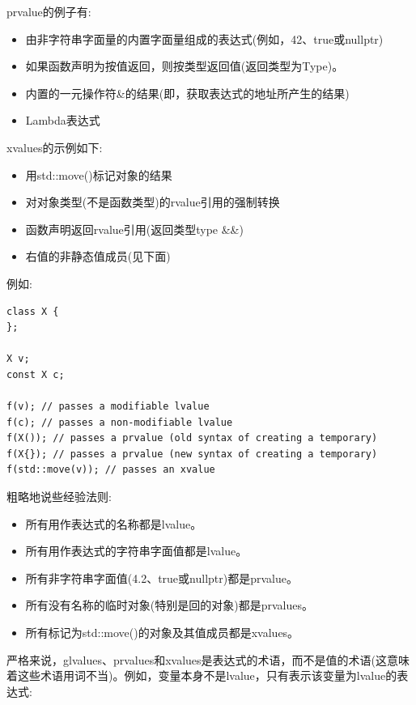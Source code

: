 prvalue的例子有:\par

\begin{itemize}
	\item 由非字符串字面量的内置字面量组成的表达式(例如，42、true或nullptr)
	\item 如果函数声明为按值返回，则按类型返回值(返回类型为Type)。
	\item 内置的一元操作符\&的结果(即，获取表达式的地址所产生的结果)
	\item Lambda表达式
\end{itemize}

xvalues的示例如下:\par

\begin{itemize}
	\item 用std::move()标记对象的结果
	\item 对对象类型(不是函数类型)的rvalue引用的强制转换
	\item 函数声明返回rvalue引用(返回类型type \&\&)
	\item 右值的非静态值成员(见下面)
\end{itemize}

例如:\par

\begin{lstlisting}[caption={}]
class X {
};

X v;
const X c;

f(v); // passes a modifiable lvalue
f(c); // passes a non-modifiable lvalue
f(X()); // passes a prvalue (old syntax of creating a temporary)
f(X{}); // passes a prvalue (new syntax of creating a temporary)
f(std::move(v)); // passes an xvalue
\end{lstlisting}

粗略地说些经验法则:\par

\begin{itemize}
	\item 所有用作表达式的名称都是lvalue。
	\item 所有用作表达式的字符串字面值都是lvalue。
	\item 所有非字符串字面值(4.2、true或nullptr)都是prvalue。
	\item 所有没有名称的临时对象(特别是回的对象)都是prvalues。
	\item 所有标记为std::move()的对象及其值成员都是xvalues。
\end{itemize}

严格来说，glvalues、prvalues和xvalues是表达式的术语，而不是值的术语(这意味着这些术语用词不当)。例如，变量本身不是lvalue，只有表示该变量为lvalue的表达式:\par

